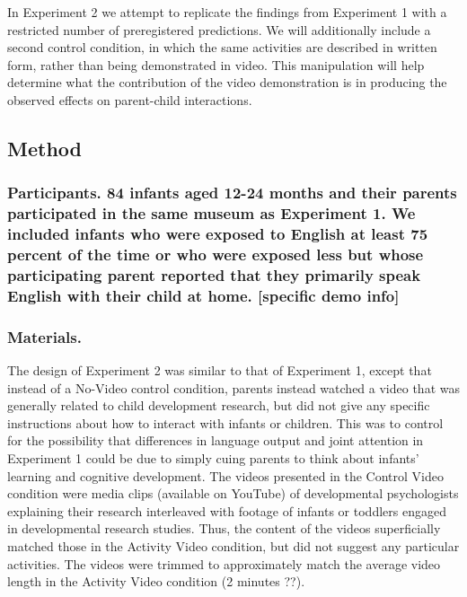 \documentclass[10pt, letterpaper]{article}
\begin{document}
In Experiment 2 we attempt to replicate the findings from Experiment 1
with a restricted number of preregistered predictions. We will
additionally include a second control condition, in which the same
activities are described in written form, rather than being demonstrated
in video. This manipulation will help determine what the contribution of
the video demonstration is in producing the observed effects on
parent-child interactions.

\subsection{Method}\label{method-1}

\subsubsection{Participants. 84 infants aged 12-24 months and their
parents participated in the same museum as Experiment 1. We included
infants who were exposed to English at least 75 percent of the time or
who were exposed less but whose participating parent reported that they
primarily speak English with their child at home. {[}specific demo
info{]}}\label{participants.-84-infants-aged-12-24-months-and-their-parents-participated-in-the-same-museum-as-experiment-1.-we-included-infants-who-were-exposed-to-english-at-least-75-percent-of-the-time-or-who-were-exposed-less-but-whose-participating-parent-reported-that-they-primarily-speak-english-with-their-child-at-home.-specific-demo-info}

\subsubsection{Materials.}\label{materials.-1}

The design of Experiment 2 was similar to that of Experiment 1, except
that instead of a No-Video control condition, parents instead watched a
video that was generally related to child development research, but did
not give any specific instructions about how to interact with infants or
children. This was to control for the possibility that differences in
language output and joint attention in Experiment 1 could be due to
simply cuing parents to think about infants' learning and cognitive
development. The videos presented in the Control Video condition were
media clips (available on YouTube) of developmental psychologists
explaining their research interleaved with footage of infants or
toddlers engaged in developmental research studies. Thus, the content of
the videos superficially matched those in the Activity Video condition,
but did not suggest any particular activities. The videos were trimmed
to approximately match the average video length in the Activity Video
condition (2 minutes ??).
\end{document}
